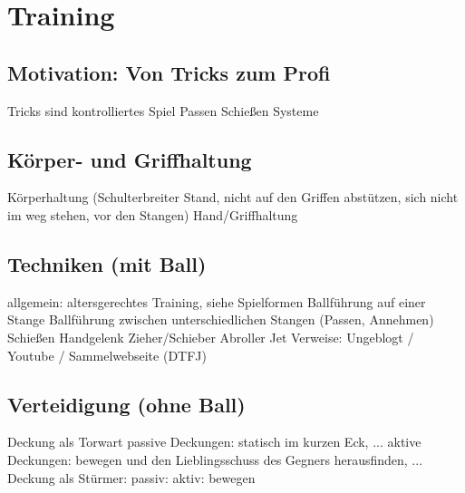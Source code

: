 \chapter{Training}

\section{Motivation: Von Tricks zum Profi}
Tricks sind kontrolliertes Spiel
Passen
Schießen
Systeme

\section{Körper- und Griffhaltung}
Körperhaltung (Schulterbreiter Stand, nicht auf den Griffen abstützen, sich nicht im weg stehen, vor den Stangen)
Hand/Griffhaltung

\section{Techniken (mit Ball)}
allgemein: altersgerechtes Training, siehe Spielformen
Ballführung auf einer Stange
Ballführung zwischen unterschiedlichen Stangen (Passen, Annehmen)
Schießen
Handgelenk
Zieher/Schieber
Abroller
Jet
Verweise: Ungeblogt / Youtube / Sammelwebseite (DTFJ)

\section{Verteidigung (ohne Ball)}
Deckung als Torwart
passive Deckungen: statisch im kurzen Eck, ...
aktive Deckungen: bewegen und den Lieblingsschuss des Gegners herausfinden, ...
Deckung als Stürmer:
passiv: 
aktiv: bewegen


